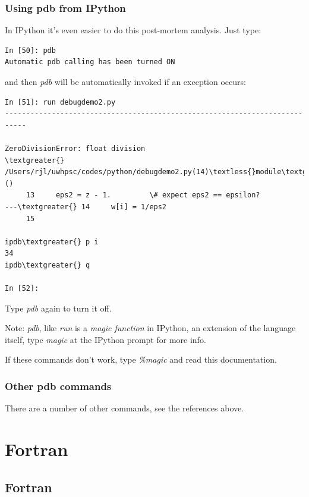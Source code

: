 \documentclass[letterpaper,10pt,english]{sphinxmanual}
\begin{document}
\subsection{Using pdb from IPython}
\label{python_debugging:using-pdb-from-ipython}
In IPython it's even easier to do this post-mortem analysis.  Just type:

\begin{Verbatim}[commandchars=\\\{\}]
In [50]: pdb
Automatic pdb calling has been turned ON
\end{Verbatim}

and then \emph{pdb} will be automatically invoked if an exception occurs:

\begin{Verbatim}[commandchars=\\\{\}]
In [51]: run debugdemo2.py
---------------------------------------------------------------------------

ZeroDivisionError: float division
\textgreater{} /Users/rjl/uwhpsc/codes/python/debugdemo2.py(14)\textless{}module\textgreater{}()
     13     eps2 = z - 1.         \# expect eps2 == epsilon?
---\textgreater{} 14     w[i] = 1/eps2
     15

ipdb\textgreater{} p i
34
ipdb\textgreater{} q

In [52]:
\end{Verbatim}

Type \emph{pdb} again to turn it off.

Note: \emph{pdb}, like \emph{run} is a \emph{magic function} in IPython, an extension of
the language itself, type \emph{magic} at the IPython prompt for more info.

If these commands don't work, type \emph{\%magic} and read this documentation.


\subsection{Other pdb commands}
\label{python_debugging:other-pdb-commands}
There are a number of other commands, see the references above.


\chapter{Fortran}
\label{index:toc-fortran}\label{index:fortran}

\section{Fortran}
\label{fortran:fortran}\label{fortran::doc}\label{fortran:id1}
\end{document}
